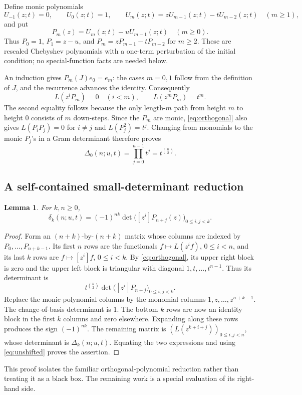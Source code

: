 \documentclass[11pt,letterpaper]{article}
\numberwithin{equation}{section}
\newtheorem{lemma}[theorem]{Lemma}
\theoremstyle{definition}
\begin{document}
Define monic polynomials
\begin{equation}\label{eq:U}
 U_{-1}(z;t)=0,\qquad U_0(z;t)=1,\qquad
 U_m(z;t)=zU_{m-1}(z;t)-tU_{m-2}(z;t)\quad(m\ge1),
\end{equation}
and put
\begin{equation}\label{eq:P}
 P_m(z)=U_m(z;t)-uU_{m-1}(z;t)\quad(m\ge0).
\end{equation}
Thus \(P_0=1\), \(P_1=z-u\), and
\(P_m=zP_{m-1}-tP_{m-2}\) for \(m\ge2\).
These are rescaled Chebyshev polynomials with a one-term perturbation of
the initial condition; no special-function facts are needed below.

An induction gives \(P_m(J)e_0=e_m\): the cases \(m=0,1\) follow
from the definition of \(J\), and the recurrence advances the identity.
Consequently
\begin{equation}\label{eq:orthogonal}
 L(z^iP_m)=0\quad(i<m),\qquad L(z^mP_m)=t^m.
\end{equation}
The second equality follows because the only length-\(m\) path from
height \(m\) to height 0 consists of \(m\) down-steps.
Since the \(P_m\) are monic, \eqref{eq:orthogonal} also gives
\(L(P_iP_j)=0\) for \(i\ne j\) and \(L(P_j^2)=t^j\).
Changing from monomials to the monic \(P_j\)'s in a Gram determinant
therefore proves
\begin{equation}\label{eq:unshifted}
 \Delta_0(n;u,t)=\prod_{j=0}^{n-1}t^j=t^{\binom n2}.
\end{equation}

\subsection{A self-contained small-determinant reduction}
\begin{lemma}\label{lem:reduction}
For \(k,n\ge0\),
\begin{equation}\label{eq:small}
 \delta_k(n;u,t)=(-1)^{nk}
 \det\bigl([z^i]P_{n+j}(z)\bigr)_{0\le i,j<k}.
\end{equation}
\end{lemma}
\begin{proof}
Form an \((n+k)\)-by-\((n+k)\) matrix whose columns are indexed by
\(P_0,\ldots,P_{n+k-1}\). Its first \(n\) rows are the functionals
\(f\mapsto L(z^if)\), \(0\le i<n\), and its last \(k\) rows are
\(f\mapsto[z^i]f\), \(0\le i<k\).
By \eqref{eq:orthogonal}, its upper right block is zero and the upper
left block is triangular with diagonal \(1,t,\ldots,t^{n-1}\).
Thus its determinant is
\[
 t^{\binom n2}\det\bigl([z^i]P_{n+j}\bigr)_{0\le i,j<k}.
\]
Replace the monic-polynomial columns by the monomial columns
\(1,z,\ldots,z^{n+k-1}\). The change-of-basis determinant is 1.
The bottom \(k\) rows are now an identity block in the first \(k\)
columns and zero elsewhere. Expanding along these rows produces the sign
\((-1)^{nk}\). The remaining matrix is
\((L(z^{k+i+j}))_{0\le i,j<n}\), whose determinant is
\(\Delta_k(n;u,t)\). Equating the two expressions and using
\eqref{eq:unshifted} proves the assertion.
\end{proof}
This proof isolates the familiar orthogonal-polynomial reduction rather
than treating it as a black box. The remaining work is a special
evaluation of its right-hand side.
\end{document}
